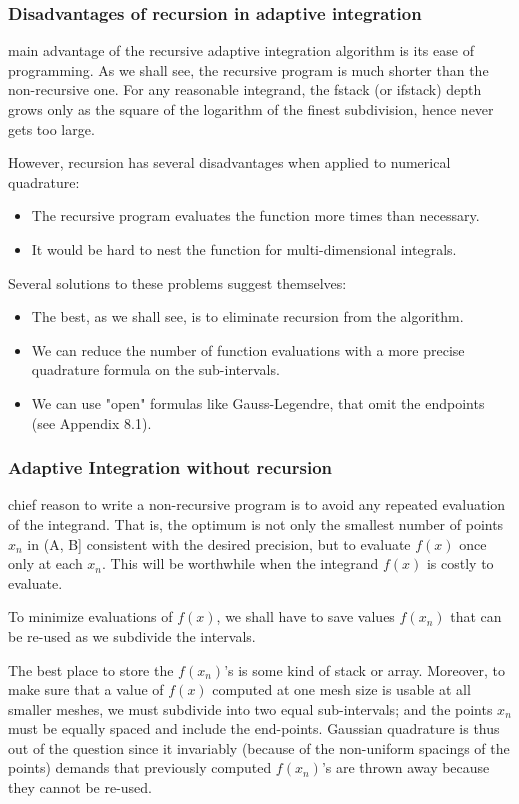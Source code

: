 \subsubsection{Disadvantages of recursion in adaptive integration}
 main advantage of the recursive adaptive integration algorithm is its ease of programming. As we shall see, the recursive program is much shorter than the non-recursive one. For any reasonable integrand, the fstack (or ifstack) depth grows only as the square of the logarithm of the finest subdivision, hence never gets too large.

However, recursion has several disadvantages when applied to numerical quadrature:

\begin{itemize}
    \item The recursive program evaluates the function more times than necessary.
    \item It would be hard to nest the function  for multi-dimensional integrals.
\end{itemize}

Several solutions to these problems suggest themselves:
\begin{itemize}
    \item The best, as we shall see, is to eliminate recursion from the algorithm.
    \item We can reduce the number of function evaluations with a more precise quadrature formula on the sub-intervals.
    \item We can use "open" formulas like Gauss-Legendre, that omit the endpoints (see Appendix 8.1).
\end{itemize}

\subsubsection{Adaptive Integration without recursion}
 chief reason to write a non-recursive program is to avoid any repeated evaluation of the integrand. That is, the optimum
is not only the smallest number of points $x_n$ in (A, B] consistent with the desired precision, but to evaluate $f(x)$ once only at each $x_n$. This will be worthwhile when the integrand $f(x)$ is costly to evaluate.

To minimize evaluations of $f(x)$, we shall have to save values $f(x_n)$ that can be re-used as we subdivide the intervals.

The best place to store the $f(x_n)$’s is some kind of stack or array. Moreover, to make sure that a value of $f(x)$ computed at one mesh size is usable at all smaller meshes, we must subdivide into two equal sub-intervals; and the points $x_n$ must be equally spaced and include the end-points. Gaussian quadrature is thus out of the question since it invariably (because of the non-uniform spacings of the points) demands that previously computed $f(x_n)$’s are thrown away because they cannot be re-used.

